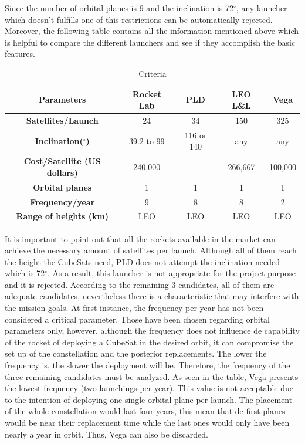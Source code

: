 Since the number of orbital planes is 9 and the inclination is 72$^{\circ}$, any launcher which doesn't fulfills one of this restrictions can be automatically rejected. 
\newline
\newline
 Moreover, the following table contains all the information mentioned above which is helpful to compare the different launchers and see if they accomplish the basic features. 
\newline	
	\begin{table}[h]
	\begin{center}
	\begin{tabular}{|c|c|c|c|c|}
	\hline
	 \bf{Parameters} & \bf{Rocket Lab} & \bf{PLD} & \bf{LEO L\&L} & \bf{Vega}\\
	\hline 
	\bf{Satellites/Launch} & 24 & 34 & 150 & 325 \\
	\hline 
	\bf{Inclination($^{\circ}$) } & {39.2 to 99} & {116 or 140} & {any} & {any}\\
	\hline 
	 \bf{Cost/Satellite (US dollars)} & 240,000 & - & 266,667 & 100,000\\
	\hline 
	\bf{Orbital planes} & 1 & 1 & 1 & 1 \\
	\hline 
	\bf{Frequency/year} & 9 & 8 & 8 & 2 \\
	\hline 
	\bf{Range of heights (km)} & LEO & LEO & LEO & LEO\\
	\hline
	\end{tabular}
	\end{center}
	\caption{Criteria}
	\end{table} 
\newline
\newline
It is important to point out that all the rockets available in the market can achieve the necessary amount of satellites per launch. Although all of them reach the height the CubeSats need, PLD does not attempt the inclination needed which is 72$^{\circ}$. As a result, this launcher is not appropriate for the project purpose and it is rejected. 
According to the remaining 3 candidates, all of them are adequate candidates, nevertheless there is a characteristic that may interfere with the mission goals. At first instance, the frequency per year has not been considered a critical parameter. Those have been chosen regarding orbital parameters only, however, although the frequency does not influence de capability of the rocket of deploying a CubeSat in the desired orbit, it can compromise the set up of the constellation and the posterior replacements. The lower the frequency is, the slower the deployment will be. Therefore, the frequency of the three remaining candidates must be analyzed. As seen in the table, Vega presents the lowest frequency (two launchings per year). This value is not acceptable due to the intention of deploying one single orbital plane per launch. The placement of the whole constellation would last four years, this mean that de first planes would be near their replacement time while the last ones would only have been nearly a year in orbit. Thus, Vega can also be discarded. 
